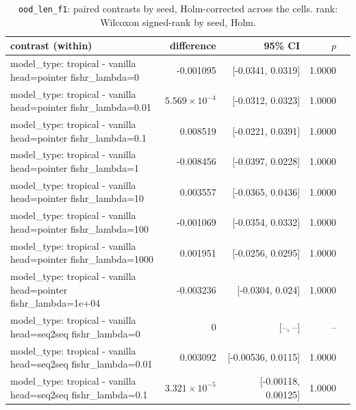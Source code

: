\documentclass[10pt]{article}
\makeatletter
\newcommand{\stackcell}[1]{\begin{tabular}[t]{@{}l@{}}#1\end{tabular}}
\makeatother
\begin{document}
{\small
\begin{longtable}{lrrrl}
\caption{\texttt{ood\_len\_f1}: paired contrasts by seed, Holm-corrected across the cells. rank: Wilcoxon signed-rank by seed, Holm.}\label{tab:paired-ood_len_f1}\\
\toprule
contrast (within) & difference & 95\% CI & $p$ & \\
\midrule
\endhead
\stackcell{model\_type: tropical - vanilla\\\footnotesize head=pointer fishr\_lambda=0 } & -0.001095 & [-0.0341, 0.0319] & 1.0000 & \\
\stackcell{model\_type: tropical - vanilla\\\footnotesize head=pointer fishr\_lambda=0.01 } & $5.569\times10^{-4}$ & [-0.0312, 0.0323] & 1.0000 & \\
\stackcell{model\_type: tropical - vanilla\\\footnotesize head=pointer fishr\_lambda=0.1 } & 0.008519 & [-0.0221, 0.0391] & 1.0000 & \\
\stackcell{model\_type: tropical - vanilla\\\footnotesize head=pointer fishr\_lambda=1 } & -0.008456 & [-0.0397, 0.0228] & 1.0000 & \\
\stackcell{model\_type: tropical - vanilla\\\footnotesize head=pointer fishr\_lambda=10 } & 0.003557 & [-0.0365, 0.0436] & 1.0000 & \\
\stackcell{model\_type: tropical - vanilla\\\footnotesize head=pointer fishr\_lambda=100 } & -0.001069 & [-0.0354, 0.0332] & 1.0000 & \\
\stackcell{model\_type: tropical - vanilla\\\footnotesize head=pointer fishr\_lambda=1000 } & 0.001951 & [-0.0256, 0.0295] & 1.0000 & \\
\stackcell{model\_type: tropical - vanilla\\\footnotesize head=pointer fishr\_lambda=1e+04 } & -0.003236 & [-0.0304, 0.024] & 1.0000 & \\
\stackcell{model\_type: tropical - vanilla\\\footnotesize head=seq2seq fishr\_lambda=0 } & 0 & [--, --] & -- & \\
\stackcell{model\_type: tropical - vanilla\\\footnotesize head=seq2seq fishr\_lambda=0.01 } & 0.003092 & [-0.00536, 0.0115] & 1.0000 & \\
\stackcell{model\_type: tropical - vanilla\\\footnotesize head=seq2seq fishr\_lambda=0.1 } & $3.321\times10^{-5}$ & [-0.00118, 0.00125] & 1.0000 & \\

\end{longtable}}
\end{document}
